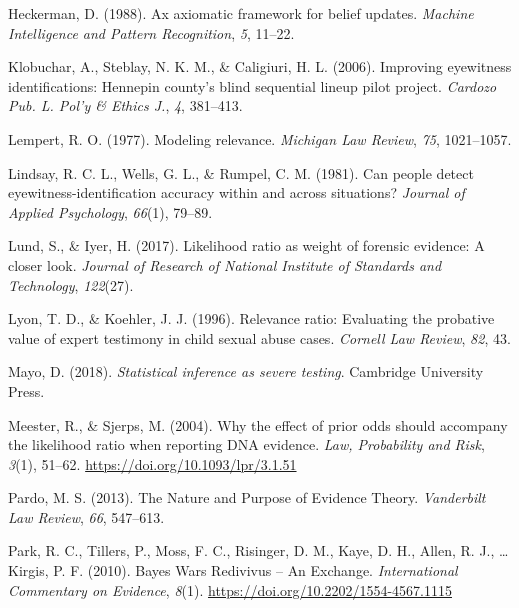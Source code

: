 \documentclass[
  letterpaper,
  DIV=11,
  numbers=noendperiod]{scrartcl}
\newlength{\cslhangindent}
\newlength{\cslentryspacingunit} %
\newenvironment{CSLReferences}[2] %
 {%
  \setlength{\parindent}{0pt}
  \ifodd #1
  \let\oldpar\par
  \def\par{\hangindent=\cslhangindent\oldpar}
  \fi
  \setlength{\parskip}{#2\cslentryspacingunit}
 }%
 {}
\begin{document}
\begin{CSLReferences}{1}{0}
\leavevmode{}%
Heckerman, D. (1988). Ax axiomatic framework for belief updates.
\emph{Machine Intelligence and Pattern Recognition}, \emph{5}, 11--22.

\leavevmode{}%
Klobuchar, A., Steblay, N. K. M., \& Caligiuri, H. L. (2006). Improving
eyewitness identifications: Hennepin county's blind sequential lineup
pilot project. \emph{Cardozo Pub. L. Pol'y \& Ethics J.}, \emph{4},
381--413.

\leavevmode{}%
Lempert, R. O. (1977). Modeling relevance. \emph{Michigan Law Review},
\emph{75}, 1021--1057.

\leavevmode{}%
Lindsay, R. C. L., Wells, G. L., \& Rumpel, C. M. (1981). Can people
detect eyewitness-identification accuracy within and across situations?
\emph{Journal of Applied Psychology}, \emph{66}(1), 79--89.

\leavevmode{}%
Lund, S., \& Iyer, H. (2017). Likelihood ratio as weight of forensic
evidence: A closer look. \emph{Journal of Research of National Institute
of Standards and Technology}, \emph{122}(27).

\leavevmode{}%
Lyon, T. D., \& Koehler, J. J. (1996). Relevance ratio: Evaluating the
probative value of expert testimony in child sexual abuse cases.
\emph{Cornell Law Review}, \emph{82}, 43.

\leavevmode{}%
Mayo, D. (2018). \emph{Statistical inference as severe testing}.
Cambridge University Press.

\leavevmode{}%
Meester, R., \& Sjerps, M. (2004). Why the effect of prior odds should
accompany the likelihood ratio when reporting {DNA} evidence. \emph{Law,
Probability and Risk}, \emph{3}(1), 51--62.
\url{https://doi.org/10.1093/lpr/3.1.51}

\leavevmode{}%
Pardo, M. S. (2013). The {Nature} and {Purpose} of {Evidence Theory}.
\emph{Vanderbilt Law Review}, \emph{66}, 547--613.

\leavevmode{}%
Park, R. C., Tillers, P., Moss, F. C., Risinger, D. M., Kaye, D. H.,
Allen, R. J., \ldots{} Kirgis, P. F. (2010). Bayes {Wars Redivivus} --
{An Exchange}. \emph{International Commentary on Evidence}, \emph{8}(1).
\url{https://doi.org/10.2202/1554-4567.1115}


\end{CSLReferences}
\end{document}
